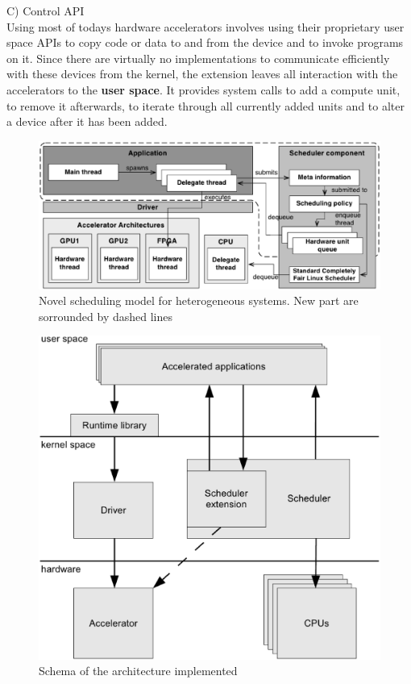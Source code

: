 \documentclass[a4paper,13pt]{article}
\begin{document}
\begin{multicols}{2}
C) Control API\\

Using most of todays hardware accelerators involves using their proprietary user space APIs to copy 
code or data to and from the device and to invoke programs on it. Since there are virtually no 
implementations to communicate efficiently with these devices from the kernel, the extension leaves 
all interaction with the accelerators to the {\bf user space}. It provides system calls to add a compute
unit, to remove it afterwards, to iterate through all currently added units and to alter a device 
after it has been added.
\end{multicols}
    \vspace{35ex}
    \begin{figure}[H]
        \centering
        \includegraphics[width=13cm]{eps/scherma2.eps}
        \caption{Novel scheduling model for heterogeneous systems. New part are sorrounded by dashed lines}
    \end{figure}
    \begin{figure}[H]
        \centering
        \vspace{40ex}
        \includegraphics[width=13cm]{eps/schema.eps}
        \caption{Schema of the architecture implemented}
    \end{figure}
\end{document}
